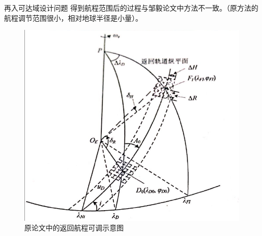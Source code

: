 \documentclass[11pt]{ctexbeamer}
\begin{document}
\begin{frame}{再入可达域设计问题}
	得到航程范围后的过程与邹毅论文中方法不一致。（原方法的航程调节范围很小，相对地球半径是小量）。\\
	\begin{figure}[]
		\centering
		\includegraphics[height=.6\textheight]{old_method.png}
		\caption{原论文中的返回航程可调示意图}
	\end{figure}
\end{frame}
\end{document}
